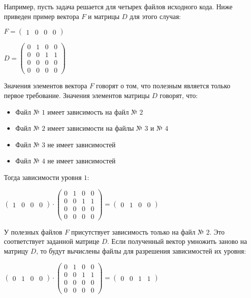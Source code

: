 Например, пусть задача решается для четырех файлов исходного кода. Ниже приведен пример вектора $F$ и матрицы $D$ для этого случая:
\begin{center}
  $
    F = \begin{pmatrix}
      1 & 0 & 0 & 0 
    \end{pmatrix}
  $
\end{center}
\begin{center}
  $
    D = \begin{pmatrix}
    0 & 1 & 0 & 0 \\
    0 & 0 & 1 & 1 \\
    0 & 0 & 0 & 0 \\
    0 & 0 & 0 & 0 
    \end{pmatrix}
  $
\end{center}
Значения элементов вектора $F$ говорят о том, что полезным является только первое требование. Значения элементов матрицы $D$ говорят, что:
\begin{itemize}
  \item Файл № $1$ имеет зависимость на файл № $2$
  \item Файл № $2$ имеет зависимости на файлы № $3$ и № $4$
  \item Файл № $3$ не имеет зависимостей
  \item Файл № $4$ не имеет зависимостей
\end{itemize}
Тогда зависимости уровня $1$:
\begin{center}
  $
  \begin{pmatrix}
    1 & 0 & 0 & 0 
  \end{pmatrix}
  \cdot
  \begin{pmatrix}
    0 & 1 & 0 & 0 \\
    0 & 0 & 1 & 1 \\
    0 & 0 & 0 & 0 \\
    0 & 0 & 0 & 0 
  \end{pmatrix}
  = 
  \begin{pmatrix}
    0 & 1 & 0 & 0 
  \end{pmatrix}
  $
\end{center}
У полезных файлов $F$ присутствует зависимость только на файл № $2$. Это соответствует заданной матрице $D$. Если полученный вектор умножить заново на матрицу $D$, то будут вычислены файлы для разрешения зависимостей их уровня:
\begin{center}
  $
  \begin{pmatrix}
    0 & 1 & 0 & 0 
  \end{pmatrix}
  \cdot
  \begin{pmatrix}
  0 & 1 & 0 & 0 \\
  0 & 0 & 1 & 1 \\
  0 & 0 & 0 & 0 \\
  0 & 0 & 0 & 0 
  \end{pmatrix}
  = 
  \begin{pmatrix}
    0 & 0 & 1 & 1 
  \end{pmatrix}
  $
\end{center}

